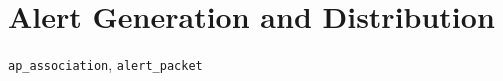 \section{Alert Generation and Distribution}
\label{sec:alerts}

\texttt{ap\_association}, \texttt{alert\_packet}
